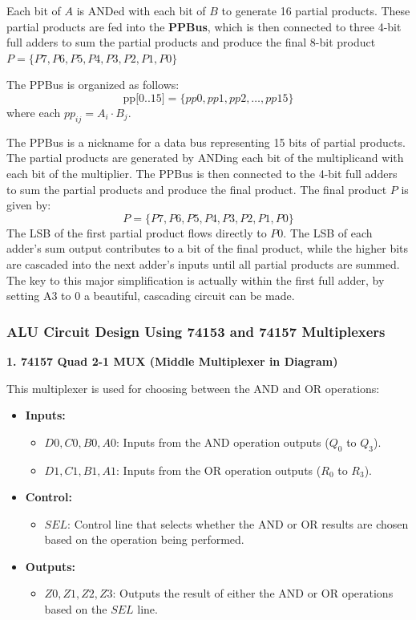 \documentclass[12pt]{article}
\begin{document}
Each bit of \( A \) is ANDed with each bit of \( B \) to generate 16 partial products.
These partial products are fed into the \textbf{PPBus}, which is then connected to three 4-bit full adders to sum the partial products and produce the final 8-bit product \( P = \{P7, P6, P5, P4, P3, P2, P1, P0\} \)

The PPBus is organized as follows:
\[
	\text{pp[0..15]} = \{ pp0, pp1, pp2, \dots, pp15 \}
\]
where each \( pp_{ij} = A_i \cdot B_j \).

The PPBus is a nickname for a data bus representing 15 bits of partial products. The partial products are generated by ANDing each bit of the multiplicand with each bit of the multiplier. The PPBus is then connected to the 4-bit full adders to sum the partial products and produce the final product.
The final product \( P \) is given by:
\[
	P = \{ P7, P6, P5, P4, P3, P2, P1, P0 \}
\]
The LSB of the first partial product flows directly to \( P0 \). The LSB of each adder's sum output contributes to a bit of the final product, while the higher bits are cascaded into the next adder’s inputs until all partial products are summed. The key to this major simplification is actually within the first full adder, by setting A3 to \(0\) a beautiful, cascading circuit can be made.
\subsubsection*{ALU Circuit Design Using 74153 and 74157 Multiplexers}
\textbf{1. 74157 Quad 2-1 MUX (Middle Multiplexer in Diagram)}

This multiplexer is used for choosing between the AND and OR operations:
\begin{itemize}
	\item \textbf{Inputs:}
	      \begin{itemize}
		      \item \( D0, C0, B0, A0 \): Inputs from the AND operation outputs (\( Q_0 \) to \( Q_3 \)).
		      \item \( D1, C1, B1, A1 \): Inputs from the OR operation outputs (\( R_0 \) to \( R_3 \)).
	      \end{itemize}
	\item \textbf{Control:}
	      \begin{itemize}
		      \item \( SEL \): Control line that selects whether the AND or OR results are chosen based on the operation being performed.
	      \end{itemize}
	\item \textbf{Outputs:}
	      \begin{itemize}
		      \item \( Z0, Z1, Z2, Z3 \): Outputs the result of either the AND or OR operations based on the \( SEL \) line.
	      \end{itemize}
\end{itemize}
\end{document}
